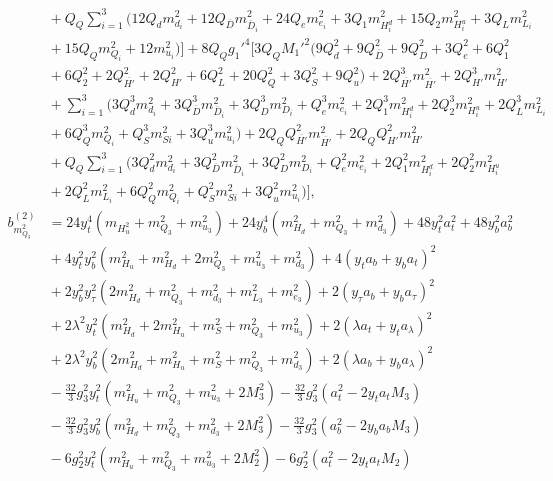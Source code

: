 \documentclass[preprint,amsmath,amssymb,aps,superscriptaddress,prd,showpacs,floatfix,nofootinbib]{revtex4-1}
\begin{document}
\begin{subequations}
\begin{align}
&{}+Q_Q\sum_{i=1}^3\big ( 12Q_dm_{d_i}^2+12Q_{\overline{D}}m_{\overline{D}_i}^2+24Q_em_{e_i}^2+3Q_1m_{H_i^d}^2+15Q_2m_{H_i^u}^2+3Q_Lm_{L_i}^2\nonumber\\
&{}+15Q_Qm_{Q_i}^2+12m_{u_i}^2\big )\bigg ]+8Q_Qg_1'^4\bigg [ 3Q_QM_1'^2\big ( 9Q_d^2+9Q_{\overline{D}}^2+9Q_D^2+3Q_e^2+6Q_1^2\nonumber\\
&{}+6Q_2^2+2Q_{\overline{H'}}^2+2Q_{H'}^2+6Q_L^2+20Q_Q^2+3Q_S^2+9Q_u^2\big )+2Q_{\overline{H'}}^3m_{\overline{H'}}^2+2Q_{H'}^3m_{H'}^2\nonumber\\
&{}+\sum_{i=1}^3\big ( 3Q_d^3m_{d_i}^2+3Q_{\overline{D}}^3m_{\overline{D}_i}^2+3Q_D^3m_{D_i}^2+Q_e^3m_{e_i}^2+2Q_1^3m_{H_i^d}^2+2Q_2^3m_{H_i^u}^2+2Q_L^3m_{L_i}^2\nonumber\\
&{}+6Q_Q^3m_{Q_i}^2+Q_S^3m_{Si}^2+3Q_u^3m_{u_i}^2\big )+2Q_QQ_{\overline{H'}}^2m_{\overline{H'}}^2+2Q_QQ_{H'}^2m_{H'}^2\nonumber\\
&{}+Q_Q\sum_{i=1}^3\big ( 3Q_d^2m_{d_i}^2+3Q_{\overline{D}}^2m_{\overline{D}_i}^2+3Q_D^2m_{D_i}^2+Q_e^2m_{e_i}^2+2Q_1^2m_{H_i^d}^2+2Q_2^2m_{H_i^u}^2\nonumber\\
&{}+2Q_L^2m_{L_i}^2+6Q_Q^2m_{Q_i}^2+Q_S^2m_{Si}^2+3Q_u^2m_{u_i}^2\big )\bigg ],\label{eq:USSMmq222BetaTwoLoop}\\
b_{m_{Q_3}^2}^{(2)}&=24y_t^4\left ( m_{H_u^2}+m_{Q_3}^2+m_{u_3}^2\right )+24y_b^4\left ( m_{H_d}^2+m_{Q_3}^2+m_{d_3}^2\right )+48y_t^2a_t^2+48y_b^2a_b^2\nonumber\\
&{}+4y_t^2y_b^2\left ( m_{H_u}^2+m_{H_d}^2+2m_{Q_3}^2+m_{u_3}^2+m_{d_3}^2\right )+4\left ( y_ta_b+y_ba_t\right )^2\nonumber\\
&{}+2y_b^2y_\tau^2\left ( 2m_{H_d}^2+m_{Q_3}^2+m_{d_3}^2+m_{L_3}^2+m_{e_3}^2\right )+2\left ( y_\tau a_b+y_ba_\tau\right )^2\nonumber\\
&{}+2\lambda^2y_t^2\left ( m_{H_d}^2+2m_{H_u}^2+m_S^2+m_{Q_3}^2+m_{u_3}^2\right )+2\left ( \lambda a_t+y_ta_\lambda\right )^2\nonumber\\
&{}+2\lambda^2y_b^2\left ( 2m_{H_d}^2+m_{H_u}^2+m_S^2+m_{Q_3}^2+m_{d_3}^2\right )+2\left ( \lambda a_b+y_ba_\lambda\right )^2\nonumber\\
&{}-\frac{32}{3}g_3^2y_t^2\left ( m_{H_u}^2+m_{Q_3}^2+m_{u_3}^2+2M_3^2\right )-\frac{32}{3}g_3^2\left ( a_t^2-2y_ta_tM_3\right )\nonumber\\
&{}-\frac{32}{3}g_3^2y_b^2\left ( m_{H_d}^2+m_{Q_3}^2+m_{d_3}^2+2M_3^2\right )-\frac{32}{3}g_3^2\left ( a_b^2-2y_ba_bM_3\right )\nonumber\\
&{}-6g_2^2y_t^2\left ( m_{H_u}^2+m_{Q_3}^2+m_{u_3}^2+2M_2^2\right )-6g_2^2\left ( a_t^2-2y_ta_tM_2\right )\nonumber\\

\end{align}
\end{subequations}
\end{document}
